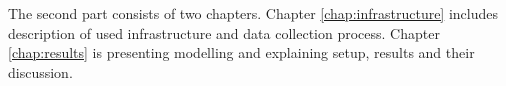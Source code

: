 The second part consists of two chapters. Chapter \ref{chap:infrastructure} includes description of used infrastructure and data collection process. Chapter \ref{chap:results} is presenting modelling and explaining setup, results and their discussion.













